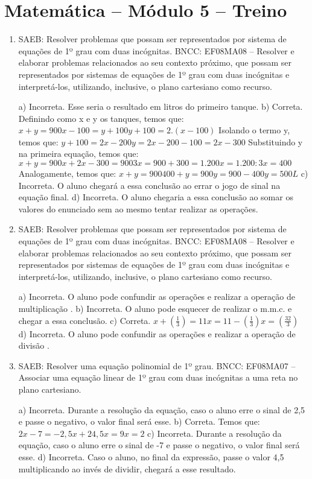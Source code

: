 \section*{Matemática – Módulo 5 – Treino}
\begin{enumerate}
\item SAEB: Resolver problemas que possam ser representados por sistema de
equações de 1º grau com duas incógnitas.
BNCC: EF08MA08 -- Resolver e elaborar problemas relacionados ao seu
contexto próximo, que possam ser representados por sistemas de equações
de 1º grau com duas incógnitas e interpretá-los, utilizando, inclusive,
o plano cartesiano como recurso.

a) Incorreta. Esse seria o resultado em litros do primeiro tanque.
b) Correta. Definindo como x e y os tanques, temos que:
$x + y = 900 x - 100 = y + 100 y + 100 = 2. (x - 100)$
Isolando o termo y, temos que:
$y + 100 = 2x- 200 y = 2x - 200 - 100 = 2x - 300$
Substituindo y na primeira equação, temos que:
$x + y = 900 x + 2x - 300 = 900 3x = 900 + 300 = 1.200 x = 1.200 : 3 x = 400$
Analogamente, temos que:
$x + y = 900 400 + y = 900 y = 900 - 400 y = 500 L$
c) Incorreta. O aluno chegará a essa conclusão ao errar o jogo de
sinal na equação final.
d) Incorreta. O aluno chegaria a essa conclusão ao somar os valores
do enunciado sem ao mesmo tentar realizar as operações.

\item SAEB: Resolver problemas que possam ser representados por sistema de
equações de 1º grau com duas incógnitas.
BNCC: EF08MA08 -- Resolver e elaborar problemas relacionados ao seu
contexto próximo, que possam ser representados por sistemas de equações
de 1º grau com duas incógnitas e interpretá-los, utilizando, inclusive,
o plano cartesiano como recurso.

a) Incorreta. O aluno pode confundir as operações e realizar a
operação de multiplicação .
b) Incorreta. O aluno pode esquecer de realizar o m.m.c. e chegar a
essa conclusão.
c) Correta.
$x + (\frac{1}{3}) = 11
x = 11 - (\frac{1}{3})
x = (\frac{32}{3})$
d) Incorreta. O aluno pode confundir as operações e realizar a
operação de divisão .

\item SAEB: Resolver uma equação polinomial de 1º grau.
BNCC: EF08MA07 -- Associar uma equação linear de 1º grau com duas
incógnitas a uma reta no plano cartesiano.

a) Incorreta. Durante a resolução da equação, caso o aluno erre o
sinal de 2,5 e passe o negativo, o valor final será esse.
b) Correta. Temos que:
$2x - 7 = -2,5x + 2
4,5x = 9
x = 2$
c) Incorreta. Durante a resolução da equação, caso o aluno erre o
sinal de -7 e passe o negativo, o valor final será esse.
d) Incorreta. Caso o aluno, no final da expressão, passe o valor
4,5 multiplicando ao invés de dividir, chegará a esse resultado.
\end{enumerate}


